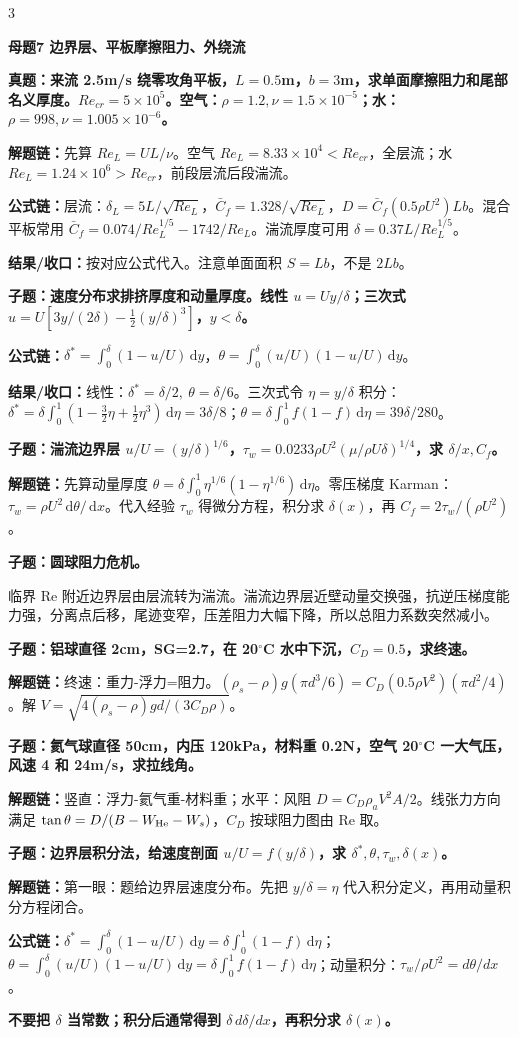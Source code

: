 \documentclass[a4paper]{article}
\newcommand{\mt}[1]{\vspace{2pt}\colorbox{M}{\parbox{\dimexpr\linewidth-2\fboxsep}{\color{white}\bfseries #1}}\par}
\newcommand{\qt}[1]{\vspace{1pt}\colorbox{Q}{\parbox{\dimexpr\linewidth-2\fboxsep}{\color{white}\bfseries #1}}\par}
\newcommand{\ans}[1]{\colorbox{G}{\parbox{\dimexpr\linewidth-2\fboxsep}{#1}}\par}
\newcommand{\warn}[1]{\colorbox{Y}{\parbox{\dimexpr\linewidth-2\fboxsep}{\color{E}\bfseries #1}}\par}
\newcommand{\chain}[1]{{\color{A}\bfseries 解题链：}#1\par}
\newcommand{\res}[1]{{\color{E}\bfseries 结果/收口：}#1\par}
\newcommand{\form}[1]{{\color{M}\bfseries 公式链：}#1\par}
\newcommand{\dd}{\,\mathrm d}
\begin{document}
\begin{multicols}{3}
\mt{母题7 边界层、平板摩擦阻力、外绕流}
\qt{真题：来流 2.5m/s 绕零攻角平板，$L=0.5$m，$b=3$m，求单面摩擦阻力和尾部名义厚度。$Re_{cr}=5\times10^5$。空气：$\rho=1.2,\nu=1.5\times10^{-5}$；水：$\rho=998,\nu=1.005\times10^{-6}$。}
\chain{先算 $Re_L=UL/\nu$。空气 $Re_L=8.33\times10^4<Re_{cr}$，全层流；水 $Re_L=1.24\times10^6>Re_{cr}$，前段层流后段湍流。}
\form{层流：$\delta_L=5L/\sqrt{Re_L}$，$\bar C_f=1.328/\sqrt{Re_L}$，$D=\bar C_f(0.5\rho U^2)Lb$。混合平板常用 $\bar C_f=0.074/Re_L^{1/5}-1742/Re_L$。湍流厚度可用 $\delta=0.37L/Re_L^{1/5}$。}
\res{按对应公式代入。注意单面面积 $S=Lb$，不是 $2Lb$。}

\qt{子题：速度分布求排挤厚度和动量厚度。线性 $u=Uy/\delta$；三次式 $u=U[3y/(2\delta)-\frac12(y/\delta)^3]$，$y<\delta$。}
\form{$\delta^*=\int_0^\delta(1-u/U)\dd y$，$\theta=\int_0^\delta(u/U)(1-u/U)\dd y$。}
\res{线性：$\delta^*=\delta/2,\ \theta=\delta/6$。三次式令 $\eta=y/\delta$ 积分：$\delta^*=\delta\int_0^1(1-\frac32\eta+\frac12\eta^3)\dd\eta=3\delta/8$；$\theta=\delta\int_0^1 f(1-f)\dd\eta=39\delta/280$。}

\qt{子题：湍流边界层 $u/U=(y/\delta)^{1/6}$，$\tau_w=0.0233\rho U^2(\mu/\rho U\delta)^{1/4}$，求 $\delta/x,C_f$。}
\chain{先算动量厚度 $\theta=\delta\int_0^1\eta^{1/6}(1-\eta^{1/6})\dd\eta$。零压梯度 Karman：$\tau_w=\rho U^2\dd\theta/\dd x$。代入经验 $\tau_w$ 得微分方程，积分求 $\delta(x)$，再 $C_f=2\tau_w/(\rho U^2)$。}

\qt{子题：圆球阻力危机。}
\ans{临界 Re 附近边界层由层流转为湍流。湍流边界层近壁动量交换强，抗逆压梯度能力强，分离点后移，尾迹变窄，压差阻力大幅下降，所以总阻力系数突然减小。}

\qt{子题：铝球直径 2cm，SG=2.7，在 20$^\circ$C 水中下沉，$C_D=0.5$，求终速。}
\chain{终速：重力-浮力=阻力。$(\rho_s-\rho)g(\pi d^3/6)=C_D(0.5\rho V^2)(\pi d^2/4)$。解 $V=\sqrt{4(\rho_s-\rho)gd/(3C_D\rho)}$。}

\qt{子题：氦气球直径 50cm，内压 120kPa，材料重 0.2N，空气 20$^\circ$C 一大气压，风速 4 和 24m/s，求拉线角。}
\chain{竖直：浮力-氦气重-材料重；水平：风阻 $D=C_D\rho_aV^2A/2$。线张力方向满足 $\tan\theta=D/(B-W_{\rm He}-W_s)$，$C_D$ 按球阻力图由 Re 取。}

\qt{子题：边界层积分法，给速度剖面 $u/U=f(y/\delta)$，求 $\delta^*,\theta,\tau_w,\delta(x)$。}
\chain{第一眼：题给边界层速度分布。先把 $y/\delta=\eta$ 代入积分定义，再用动量积分方程闭合。}
\form{$\delta^*=\int_0^\delta(1-u/U)\dd y=\delta\int_0^1(1-f)\dd\eta$；$\theta=\int_0^\delta(u/U)(1-u/U)\dd y=\delta\int_0^1 f(1-f)\dd\eta$；动量积分：$\tau_w/\rho U^2=d\theta/dx$。}
\warn{不要把 $\delta$ 当常数；积分后通常得到 $\delta\,d\delta/dx$，再积分求 $\delta(x)$。}


\end{multicols}
\end{document}
